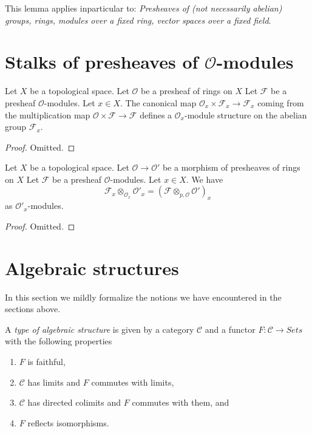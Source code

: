 \medskip\noindent
This lemma applies inparticular to:
{\it Presheaves of (not necessarily abelian) groups, rings, modules
over a fixed ring, vector spaces over a fixed field}.

\section{Stalks of presheaves of $\mathcal{O}$-modules}
\label{section-stalk-presheaves-modules}

\begin{lemma}
\label{lemma-stalk-module}
Let $X$ be a topological space.
Let $\mathcal{O}$ be a presheaf of rings on $X$
Let $\mathcal{F}$ be a presheaf $\mathcal{O}$-modules.
Let $x \in X$.
The canonical map $\mathcal{O}_x \times \mathcal{F}_x
\to \mathcal{F}_x$ coming from the multiplication map
$\mathcal{O}\times\mathcal{F} \to \mathcal{F}$ defines
a $\mathcal{O}_x$-module structure on the abelian group
$\mathcal{F}_x$.
\end{lemma}

\begin{proof}
Omitted.
\end{proof}

\begin{lemma}
\label{lemma-stalk-tensor-presheaf-modules}
Let $X$ be a topological space.
Let $\mathcal{O} \to \mathcal{O}'$ be a morphism of
presheaves of rings on $X$
Let $\mathcal{F}$ be a presheaf $\mathcal{O}$-modules.
Let $x \in X$. We have
$$
\mathcal{F}_x \otimes_{\mathcal{O}_x} \mathcal{O}'_x
=
(\mathcal{F} \otimes_{p, \mathcal{O}} \mathcal{O}')_x
$$
as $\mathcal{O}'_x$-modules.
\end{lemma}

\begin{proof}
Omitted.
\end{proof}


\section{Algebraic structures}
\label{section-algebraic-structures}

\noindent
In this section we mildly formalize the notions we have
encountered in the sections above.

\begin{definition}
\label{definition-algebraic-structure}
A {\it type of algebraic structure} is given by a category $\mathcal{C}$
and a functor $F : \mathcal{C} \to \textit{Sets}$ with the
following properties
\begin{enumerate}
\item $F$ is faithful,
\item $\mathcal{C}$ has limits and $F$ commutes with limits,
\item $\mathcal{C}$ has directed colimits and $F$ commutes with them, and
\item $F$ reflects isomorphisms.
\end{enumerate}
\end{definition}

